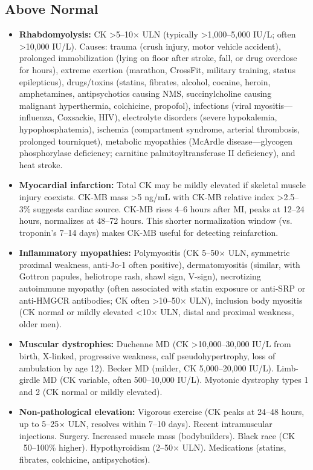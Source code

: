 \subsection*{Above Normal}
\begin{itemize}
  \item \textbf{Rhabdomyolysis:} CK >5--10$\times$ ULN (typically >1,000--5,000 IU/L; often >10,000 IU/L). Causes: trauma (crush injury, motor vehicle accident), prolonged immobilization (lying on floor after stroke, fall, or drug overdose for hours), extreme exertion (marathon, CrossFit, military training, status epilepticus), drugs/toxins (statins, fibrates, alcohol, cocaine, heroin, amphetamines, antipsychotics causing NMS, succinylcholine causing malignant hyperthermia, colchicine, propofol), infections (viral myositis---influenza, Coxsackie, HIV), electrolyte disorders (severe hypokalemia, hypophosphatemia), ischemia (compartment syndrome, arterial thrombosis, prolonged tourniquet), metabolic myopathies (McArdle disease---glycogen phosphorylase deficiency; carnitine palmitoyltransferase II deficiency), and heat stroke.
  \item \textbf{Myocardial infarction:} Total CK may be mildly elevated if skeletal muscle injury coexists. CK-MB mass >5 ng/mL with CK-MB relative index >2.5--3\% suggests cardiac source. CK-MB rises 4--6 hours after MI, peaks at 12--24 hours, normalizes at 48--72 hours. This shorter normalization window (vs. troponin's 7--14 days) makes CK-MB useful for detecting reinfarction.
  \item \textbf{Inflammatory myopathies:} Polymyositis (CK 5--50$\times$ ULN, symmetric proximal weakness, anti-Jo-1 often positive), dermatomyositis (similar, with Gottron papules, heliotrope rash, shawl sign, V-sign), necrotizing autoimmune myopathy (often associated with statin exposure or anti-SRP or anti-HMGCR antibodies; CK often >10--50$\times$ ULN), inclusion body myositis (CK normal or mildly elevated <10$\times$ ULN, distal and proximal weakness, older men).
  \item \textbf{Muscular dystrophies:} Duchenne MD (CK >10,000--30,000 IU/L from birth, X-linked, progressive weakness, calf pseudohypertrophy, loss of ambulation by age 12). Becker MD (milder, CK 5,000--20,000 IU/L). Limb-girdle MD (CK variable, often 500--10,000 IU/L). Myotonic dystrophy types 1 and 2 (CK normal or mildly elevated).
  \item \textbf{Non-pathological elevation:} Vigorous exercise (CK peaks at 24--48 hours, up to 5--25$\times$ ULN, resolves within 7--10 days). Recent intramuscular injections. Surgery. Increased muscle mass (bodybuilders). Black race (CK ~50--100\% higher). Hypothyroidism (2--50$\times$ ULN). Medications (statins, fibrates, colchicine, antipsychotics).
\end{itemize}

